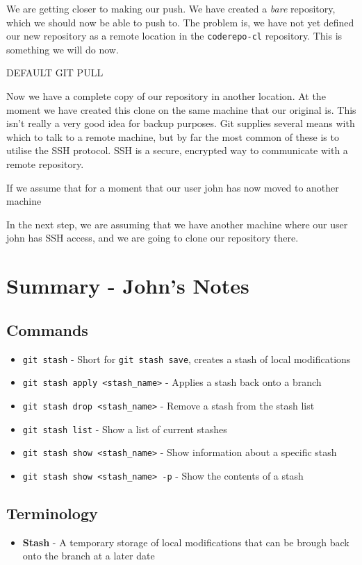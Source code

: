 We are getting closer to making our push.  We have created a \emph{bare} repository, which we should now be able to push to.  The problem is, we have not yet defined our new repository as a remote location in the \texttt{coderepo-cl} repository.  This is something we will do now.

DEFAULT GIT PULL

Now we have a complete copy of our repository in another location.  At the moment we have created this clone on the same machine that our original is.  This isn't really a very good idea for backup purposes.  Git supplies several means with which to talk to a remote machine, but by far the most common of these is to utilise the SSH protocol.  SSH is a secure, encrypted way to communicate with a remote repository.  

If we assume that for a moment that our user john has now moved to another machine

In the next step, we are assuming that we have another machine where our user john has SSH access, and we are going to clone our repository there.


\clearpage

\section{Summary - John's Notes}
\subsection{Commands}
\begin{itemize}

\item\texttt{git stash} - Short for \texttt{git stash save}, creates a stash of local modifications

\item\texttt{git stash apply <stash\_name>} - Applies a stash back onto a branch

\item\texttt{git stash drop <stash\_name>} - Remove a stash from the stash list

\item\texttt{git stash list} - Show a list of current stashes

\item\texttt{git stash show <stash\_name>} - Show information about a specific stash

\item\texttt{git stash show <stash\_name> -p} - Show the contents of a stash

\end{itemize}

\subsection{Terminology}
\begin{itemize}
\item\textbf{Stash} - A temporary storage of local modifications that can be brough back onto the branch at a later date
\end{itemize}
